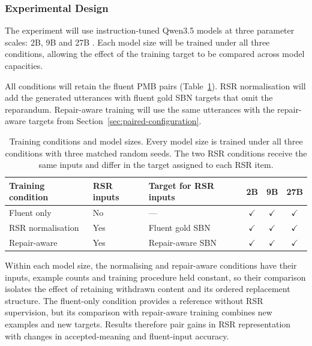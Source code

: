\documentclass{article}
\begin{document}
\subsubsection{Experimental Design}

The experiment will use instruction-tuned Qwen3.5 models at three parameter
scales: 2B, 9B and 27B \citep{qwenQwen35Native2026}. Each model size will be
trained under all three conditions, allowing the effect of the training target
to be compared across model capacities.

All conditions will retain the fluent PMB pairs (Table~\ref{tab:model-experiment}).
RSR normalisation will add the generated utterances with fluent gold SBN targets that omit
the reparandum. Repair-aware training will use the same utterances with the
repair-aware targets from Section~\ref{sec:paired-configuration}.

\begin{table}[ht]
\centering
\small
\begin{tabular}{@{}p{}p{}p{}ccc@{}}
\toprule
Training condition & RSR inputs & Target for RSR inputs & 2B & 9B & 27B \\
\midrule
Fluent only
  & No  & ---                 & $\checkmark$ & $\checkmark$ & $\checkmark$ \\
RSR normalisation
  & Yes & Fluent gold SBN    & $\checkmark$ & $\checkmark$ & $\checkmark$ \\
Repair-aware
  & Yes & Repair-aware SBN    & $\checkmark$ & $\checkmark$ & $\checkmark$ \\
\bottomrule
\end{tabular}
\caption{Training conditions and model sizes. Every model size is trained
under all three conditions with three matched random seeds. The two RSR
conditions receive the same inputs and differ in the target assigned to each
RSR item.}
\label{tab:model-experiment}
\end{table}

Within each model size, the normalising and repair-aware conditions have their
inputs, example counts and training procedure held constant, so their
comparison isolates the effect of retaining withdrawn content and its ordered
replacement structure. The fluent-only condition provides a reference without
RSR supervision, but its comparison with repair-aware training combines new
examples and new targets. Results therefore pair gains in RSR representation
with changes in accepted-meaning and fluent-input accuracy.
\end{document}
